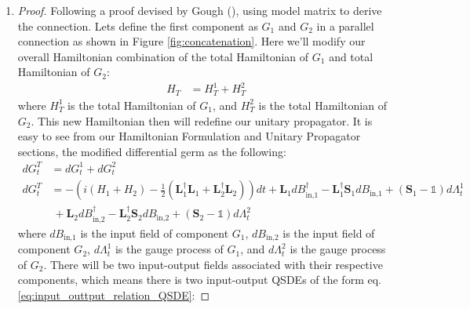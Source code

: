 \documentclass[a4paper]{article}
\theoremstyle{definition}
\newtheorem{definition}{Definition}[section]
\begin{document}
\begin{enumerate}[label=(\roman*)]
\begin{definition}{Concatenation Product.}
\begin{align*}
    G_{\text{concatenation}} = & \ G_1 \boxplus G_2 \\
    G_{\text{concatenation}} = & \ (\textbf{S}_1,\textbf{L}_1,H_1) \boxplus (\textbf{S}_2,\textbf{L}_2,H_2)
\end{align*}
\begin{align}
    G_{\text{concatenation}} = & \ \Bigg( \begin{pmatrix} \textbf{S}_1 & 0 \\ 0 & \textbf{S}_1\end{pmatrix},\begin{bmatrix} \textbf{L}_1 \\ \textbf{L}_2 \end{bmatrix},H_1 + H_2 \Bigg)
    \label{eq:concatenation}
\end{align}
\end{definition}
\item
\begin{proof}
Following a proof devised by Gough (\citealp{Gough_2008}), using model matrix to derive the connection. Lets define the first component as $G_1$ and $G_2$ in a parallel connection as shown in Figure \ref{fig:concatenation}. Here we'll modify our overall Hamiltonian combination of the total Hamiltonian of $G_1$ and total Hamiltonian of $G_2$:
\begin{align}
    H_T & = H^1_T + H^2_T
\end{align}
where $H^1_T$ is the total Hamiltonian of $G_1$, and $H^2_T$ is the total Hamiltonian of $G_2$. This new Hamiltonian then will redefine our unitary propagator. It is easy to see from our Hamiltonian Formulation and Unitary Propagator sections, the modified differential germ as the following:
\begin{align}
    dG^T_t & = dG^1_t + dG^2_t \nonumber \\
    dG^T_t & = -(i(H_1 + H_2) - \frac{1}{2}(\textbf{L}_1^\dagger \textbf{L}_1 + \textbf{L}_2^\dagger \textbf{L}_2))dt + \textbf{L}_1 dB^\dagger_\text{in,1} - \textbf{L}_1^\dagger \textbf{S}_1 dB_\text{in,1} + (\textbf{S}_1-\mathbb{1}) d\Lambda^1_t  \nonumber \\ 
    &  \ + \textbf{L}_2 dB^\dagger_\text{in,2} - \textbf{L}_2^\dagger \textbf{S}_2 dB_\text{in,2} + (\textbf{S}_2-\mathbb{1}) d\Lambda^2_t 
\end{align}
where $dB_\text{in,1}$ is the input field of component $G_1$, $dB_\text{in,2}$ is the input field of component $G_2$, $d\Lambda^1_t $ is the gauge process of $G_1$, and $d\Lambda^2_t $ is the gauge process of $G_2$. There will be two input-output fields associated with their respective components, which means there is two input-output QSDEs of the form eq. \ref{eq:input_outtput_relation_QSDE}: 

\end{proof}
\end{enumerate}
\end{document}
